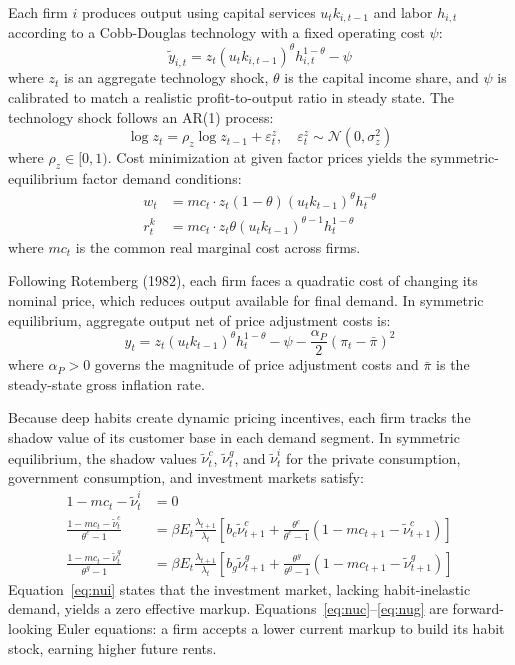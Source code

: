 \documentclass[article,11pt,letterpaper,fleqn]{article}
\theoremstyle{definition}
\numberwithin{equation}{section}
\begin{document}
Each firm $i$ produces output using capital services $u_t k_{i,t-1}$ and labor $h_{i,t}$ according to a Cobb-Douglas technology with a fixed operating cost $\psi$:
\begin{equation}\label{eq:prodfunc}
\tilde{y}_{i,t} = z_t(u_t k_{i,t-1})^{\theta}h_{i,t}^{1-\theta} - \psi
\end{equation}
where $z_t$ is an aggregate technology shock, $\theta$ is the capital income share, and $\psi$ is calibrated to match a realistic profit-to-output ratio in steady state. The technology shock follows an AR(1) process:
\begin{equation}\label{eq:techshock}
\log z_t = \rho_z \log z_{t-1} + \varepsilon_t^z, \quad \varepsilon_t^z \sim \mathcal{N}(0,\sigma_z^2)
\end{equation}
where $\rho_z \in [0,1)$. Cost minimization at given factor prices yields the symmetric-equilibrium factor demand conditions:
\begin{align}
w_t &= mc_t \cdot z_t(1-\theta)(u_t k_{t-1})^{\theta}h_t^{-\theta} \label{eq:wfoc} \\
r_t^k &= mc_t \cdot z_t\theta(u_t k_{t-1})^{\theta-1}h_t^{1-\theta} \label{eq:rkfoc}
\end{align}
where $mc_t$ is the common real marginal cost across firms.

Following Rotemberg (1982), each firm faces a quadratic cost of changing its nominal price, which reduces output available for final demand. In symmetric equilibrium, aggregate output net of price adjustment costs is:
\begin{equation}\label{eq:ynet}
y_t = z_t(u_t k_{t-1})^{\theta}h_t^{1-\theta} - \psi - \frac{\alpha_P}{2}(\pi_t - \bar{\pi})^2
\end{equation}
where $\alpha_P > 0$ governs the magnitude of price adjustment costs and $\bar{\pi}$ is the steady-state gross inflation rate.

Because deep habits create dynamic pricing incentives, each firm tracks the shadow value of its customer base in each demand segment. In symmetric equilibrium, the shadow values $\tilde{\nu}_t^c$, $\tilde{\nu}_t^g$, and $\tilde{\nu}_t^i$ for the private consumption, government consumption, and investment markets satisfy:
\begin{align}
1 - mc_t - \tilde{\nu}_t^i &= 0 \label{eq:nui} \\
\frac{1 - mc_t - \tilde{\nu}_t^c}{\theta^c - 1} &= \beta E_t \frac{\lambda_{t+1}}{\lambda_t}\!\left[b_c\tilde{\nu}_{t+1}^c + \frac{\theta^c}{\theta^c-1}\!\left(1-mc_{t+1}-\tilde{\nu}_{t+1}^c\right)\right] \label{eq:nuc} \\
\frac{1 - mc_t - \tilde{\nu}_t^g}{\theta^g - 1} &= \beta E_t \frac{\lambda_{t+1}}{\lambda_t}\!\left[b_g\tilde{\nu}_{t+1}^g + \frac{\theta^g}{\theta^g-1}\!\left(1-mc_{t+1}-\tilde{\nu}_{t+1}^g\right)\right] \label{eq:nug}
\end{align}
Equation~\eqref{eq:nui} states that the investment market, lacking habit-inelastic demand, yields a zero effective markup. Equations~\eqref{eq:nuc}--\eqref{eq:nug} are forward-looking Euler equations: a firm accepts a lower current markup to build its habit stock, earning higher future rents.
\end{document}
